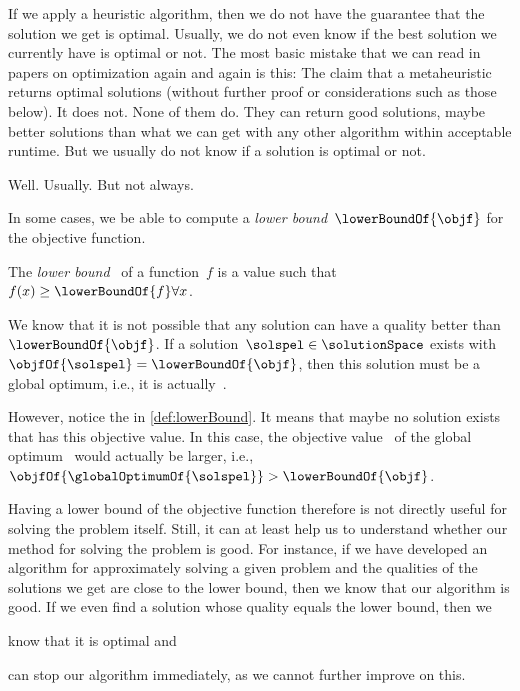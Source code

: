 %
\label{sec:objectiveFunctionBound}%
%
If we apply a heuristic algorithm, then we do not have the guarantee that the solution we get is optimal.
Usually, we do not even know if the best solution we currently have is optimal or not.
The most basic mistake that we can read in papers on optimization again and again is this:
The claim that a metaheuristic returns optimal solutions (without further proof or considerations such as those below).
It does not.
None of them do.
They can return good solutions, maybe better solutions than what we can get with any other algorithm within acceptable runtime.
But we usually do not know if a solution is optimal or not.

Well.
Usually.
But not always.

In some cases, we be able to compute a \emph{lower bound}~$\lowerBoundOf{\objf}$ for the objective function.%
%
%
%
\begin{definition}%
\label{def:lowerBound}%
The \emph{lower bound}~ of a function~$f$ is a value such that $f(x)\geq\lowerBoundOf{f}\forall x$.%
\end{definition}%
%
We know that it is not possible that any solution can have a quality better than~$\lowerBoundOf{\objf}$.
If a solution~$\solspel\in\solutionSpace$ exists with $\objfOf{\solspel}=\lowerBoundOf{\objf}$, then this solution must be a global optimum, i.e., it is actually~\globalOptimumOf{\solspel}.

However, notice the \inQuotes{$\geq$} in \autoref{def:lowerBound}.
It means that maybe no solution exists that has this objective value.
In this case, the objective value~\objfOf{\globalOptimumOf{\solspel}} of the global optimum~\globalOptimumOf{\solspel} would actually be larger, i.e., $\objfOf{\globalOptimumOf{\solspel}}>\lowerBoundOf{\objf}$.

Having a lower bound of the objective function therefore is not directly useful for solving the problem itself.
Still, it can at least help us to understand whether our method for solving the problem is good.
For instance, if we have developed an algorithm for approximately solving a given problem and the qualities of the solutions we get are close to the lower bound, then we know that our algorithm is good.
If we even find a solution whose quality equals the lower bound, then we %
\begin{enumerate*}%
\item know that it is optimal and %
\item can stop our algorithm immediately, as we cannot further improve on this.%
\end{enumerate*}

